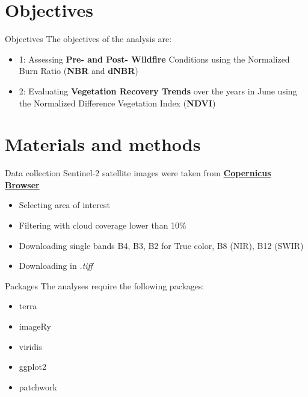 \documentclass{beamer}
\begin{document}
\section{Objectives} %

\begin{frame}{Objectives}
    The objectives of the analysis are:
    \bigskip
    \begin{itemize}
    \item    1: Assessing \textbf{Pre- and Post- Wildfire} Conditions using the Normalized Burn Ratio (\textbf{NBR} and \textbf{dNBR})

 \bigskip
    
    \item   2: Evaluating \textbf{Vegetation Recovery Trends}  over the years in June using the Normalized Difference Vegetation Index (\textbf{NDVI}) 
    \end{itemize}
\end{frame}

\section{Materials and methods} %
\begin{frame}{Data collection}
    Sentinel-2 satellite images were taken from 
    \textbf{\href{https://browser.dataspace.copernicus.eu}{Copernicus Browser}}
    \bigskip
    \begin{itemize}
        \item  Selecting area of interest
        \item  Filtering with cloud coverage lower than 10\%
        \item Downloading single bands B4, B3, B2 for True color, B8 (NIR), B12 (SWIR)
        \item Downloading in \textit{.tiff}
    \end{itemize}
\end{frame}

\begin{frame}{Packages} %
    The analyses require the following packages:
    \bigskip %
    \begin{itemize} %
        \item terra
        \item imageRy
        \item viridis
        \item ggplot2
        \item patchwork
    \end{itemize}
\end{frame}
\end{document}
